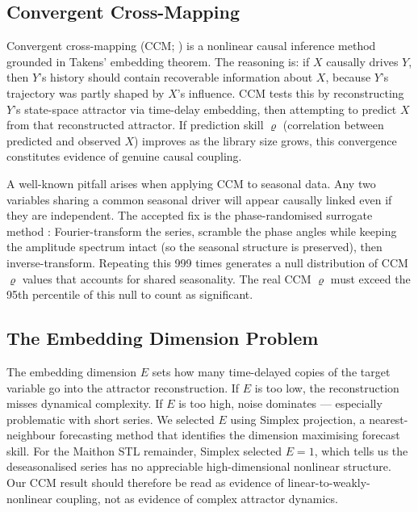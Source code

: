\documentclass[12pt,a4paper,oneside]{report}
\begin{document}
\subsection{Convergent Cross-Mapping}

Convergent cross-mapping (CCM; \citealt{Sugihara2012}) is a nonlinear
causal inference method grounded in Takens' embedding theorem. The reasoning
is: if $X$ causally drives $Y$, then $Y$'s history should contain
recoverable information about $X$, because $Y$'s trajectory was partly
shaped by $X$'s influence. CCM tests this by reconstructing $Y$'s
state-space attractor via time-delay embedding, then attempting to predict
$X$ from that reconstructed attractor. If prediction skill $\varrho$
(correlation between predicted and observed $X$) improves as the library
size grows, this convergence constitutes evidence of genuine causal
coupling.

A well-known pitfall arises when applying CCM to seasonal data. Any two
variables sharing a common seasonal driver will appear causally linked even
if they are independent. The accepted fix is the phase-randomised surrogate
method \citep{Theiler1992}: Fourier-transform the series, scramble the
phase angles while keeping the amplitude spectrum intact (so the seasonal
structure is preserved), then inverse-transform. Repeating this 999 times
generates a null distribution of CCM $\varrho$ values that accounts for
shared seasonality. The real CCM $\varrho$ must exceed the 95th percentile
of this null to count as significant.

\subsection{The Embedding Dimension Problem}

The embedding dimension $E$ sets how many time-delayed copies of the target
variable go into the attractor reconstruction. If $E$ is too low, the
reconstruction misses dynamical complexity. If $E$ is too high, noise
dominates --- especially problematic with short series. We selected $E$
using Simplex projection, a nearest-neighbour forecasting method that
identifies the dimension maximising forecast skill. For the Maithon STL
remainder, Simplex selected $E = 1$, which tells us the deseasonalised
series has no appreciable high-dimensional nonlinear structure. Our CCM
result should therefore be read as evidence of linear-to-weakly-nonlinear
coupling, not as evidence of complex attractor dynamics.

\end{document}
